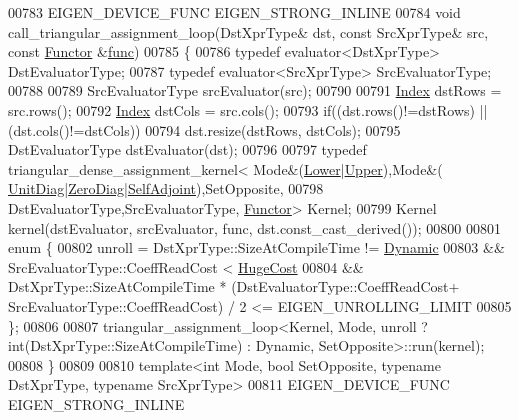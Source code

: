 \begin{DoxyCode}
00783 EIGEN\_DEVICE\_FUNC EIGEN\_STRONG\_INLINE
00784 \textcolor{keywordtype}{void} call\_triangular\_assignment\_loop(DstXprType& dst, \textcolor{keyword}{const} SrcXprType& src, \textcolor{keyword}{const} 
      \hyperlink{struct_functor}{Functor} &\hyperlink{structfunc}{func})
00785 \{
00786   \textcolor{keyword}{typedef} evaluator<DstXprType> DstEvaluatorType;
00787   \textcolor{keyword}{typedef} evaluator<SrcXprType> SrcEvaluatorType;
00788 
00789   SrcEvaluatorType srcEvaluator(src);
00790 
00791   \hyperlink{group___core___module_a554f30542cc2316add4b1ea0a492ff02}{Index} dstRows = src.rows();
00792   \hyperlink{group___core___module_a554f30542cc2316add4b1ea0a492ff02}{Index} dstCols = src.cols();
00793   \textcolor{keywordflow}{if}((dst.rows()!=dstRows) || (dst.cols()!=dstCols))
00794     dst.resize(dstRows, dstCols);
00795   DstEvaluatorType dstEvaluator(dst);
00796     
00797   \textcolor{keyword}{typedef} triangular\_dense\_assignment\_kernel< Mode&(\hyperlink{group__enums_gga39e3366ff5554d731e7dc8bb642f83cda891792b8ed394f7607ab16dd716f60e6}{Lower}|\hyperlink{group__enums_gga39e3366ff5554d731e7dc8bb642f83cda6bcb58be3b8b8ec84859ce0c5ac0aaec}{Upper}),Mode&(
      \hyperlink{group__enums_gga39e3366ff5554d731e7dc8bb642f83cdaddb72f888ac85d5a1c52333e54f9374b}{UnitDiag}|\hyperlink{group__enums_gga39e3366ff5554d731e7dc8bb642f83cda884ff7240392e85aa6e4b3c957e36483}{ZeroDiag}|\hyperlink{group__enums_gga39e3366ff5554d731e7dc8bb642f83cda2491fc6765056421f504eb7e16083e8f}{SelfAdjoint}),SetOpposite,
00798                                               DstEvaluatorType,SrcEvaluatorType,
      \hyperlink{struct_functor}{Functor}> Kernel;
00799   Kernel kernel(dstEvaluator, srcEvaluator, func, dst.const\_cast\_derived());
00800   
00801   \textcolor{keyword}{enum} \{
00802       unroll = DstXprType::SizeAtCompileTime != \hyperlink{namespace_eigen_ad81fa7195215a0ce30017dfac309f0b2}{Dynamic}
00803             && SrcEvaluatorType::CoeffReadCost < \hyperlink{namespace_eigen_a3163430a1c13173faffde69016b48aaf}{HugeCost}
00804             && DstXprType::SizeAtCompileTime * (DstEvaluatorType::CoeffReadCost+
      SrcEvaluatorType::CoeffReadCost) / 2 <= EIGEN\_UNROLLING\_LIMIT
00805     \};
00806   
00807   triangular\_assignment\_loop<Kernel, Mode, unroll ? int(DstXprType::SizeAtCompileTime) : Dynamic,
       SetOpposite>::run(kernel);
00808 \}
00809 
00810 \textcolor{keyword}{template}<\textcolor{keywordtype}{int} Mode, \textcolor{keywordtype}{bool} SetOpposite, \textcolor{keyword}{typename} DstXprType, \textcolor{keyword}{typename} SrcXprType>
00811 EIGEN\_DEVICE\_FUNC EIGEN\_STRONG\_INLINE

\end{DoxyCode}
